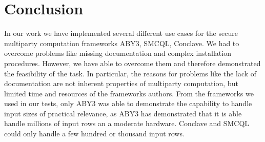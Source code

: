 \section{Conclusion}
 In our work we have implemented several different use cases for the secure multiparty computation frameworks ABY3, SMCQL, Conclave. We had to overcome problems like missing documentation and complex installation procedures. However, we have able to overcome them and therefore demonstrated the feasibility of the task. 
 In particular, the reasons for problems like the lack of documentation are not inherent properties of multiparty computation, but limited time and resources of the frameworks authors. From the frameworks we used in our tests, only ABY3 was able to demonstrate the capability to handle input sizes of practical relevance, as ABY3 has demonstrated that it is able handle millions of input rows an a moderate hardware. Conclave and SMCQL could only handle a few hundred or thousand input rows. 


